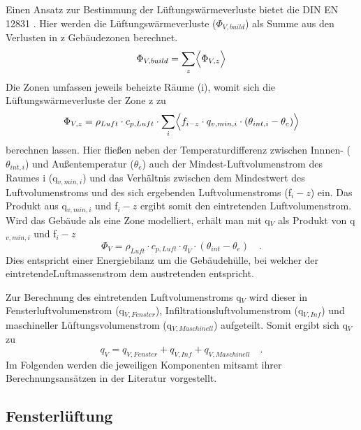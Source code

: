 Einen Ansatz zur Bestimmung der Lüftungswärmeverluste bietet die DIN EN 12831 \cite{DINDeutschesInstitutfurNormunge.V..September2017}.
Hier werden die Lüftungswärmeverluste (\(\Phi_{V,build}\)) als Summe aus den Verlusten in z Gebäudezonen berechnet.
\begin{equation}
\label{eq:Gleichung331}
\Phi_{V,build} = \sum_{z} \Bigl\langle \Phi_{V,z} \Bigr\rangle
\end{equation}
Die Zonen umfassen jeweils beheizte Räume (i), womit sich die Lüftungswärmeverluste der Zone z zu
\begin{equation}
\label{eq:Gleichung332}
\Phi_{V,z} = \rho_{Luft} \cdot c_{p,Luft} \cdot \sum_{i} \Bigl\langle f_{i-z} \cdot q_{v,min,i} \cdot (\theta_{int,i} - \theta_e) \Bigr\rangle
\end{equation}
berechnen lassen.
Hier fließen neben der Temperaturdifferenz zwischen Innnen- (\(\theta_{int,i}\)) und Außentemperatur (\(\theta_{e}\)) auch der Mindest-Luftvolumenstrom des Raumes i (q\(_{v,min,i}\)) und das Verhältnis zwischen dem Mindestwert des Luftvolumenstroms und des sich ergebenden Luftvolumenstroms (f\(_i-z\)) ein.
Das Produkt aus q\(_{v,min,i}\) und f\(_i-z\) ergibt somit den eintretenden Luftvolumenstrom.
Wird das Gebäude als eine Zone modelliert, erhält man mit q\(_V\) als Produkt von q\(_{v,min,i}\) und f\(_i-z\) 
\begin{equation}
\label{eq:Gleichung333}
\Phi_{V} = \rho_{Luft} \cdot c_{p,Luft} \cdot q_V \cdot (\theta_{int} - \theta_e) \quad \text{.}
\end{equation}
Dies entspricht einer Energiebilanz um die Gebäudehülle, bei welcher der eintretendeLuftmassenstrom dem austretenden entspricht.

Zur Berechnung des eintretenden Luftvolumenstroms q\(_V\) wird dieser in Fensterluftvolumenstrom (q\(_{V, Fenster}\)), Infiltrationsluftvolumenstrom (q\(_{V, Inf}\)) und maschineller Lüftungsvolumenstrom (q\(_{V, Maschinell}\)) aufgeteilt.
Somit ergibt sich q\(_V\) zu
\begin{equation}
\label{eq:Gleichung334}
q_V = q_{V, Fenster} + q_{V, Inf} + q_{V, Maschinell} \quad \text{.}
\end{equation}
Im Folgenden werden die jeweiligen Komponenten mitsamt ihrer Berechnungsansätzen in der Literatur vorgestellt.

\subsection{Fensterlüftung}
\label{subsec:Sektion 331}

